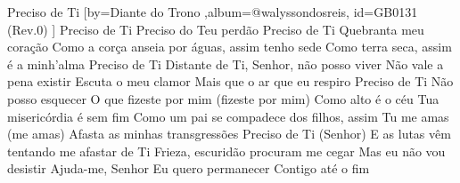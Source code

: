 \beginsong
{Preciso de Ti %
}[by={Diante do Trono %
},album={@walyssondosreis},
id={GB0131 %
(Rev.0) %
}]
\beginverse*
Preciso de Ti
Preciso do Teu perdão
Preciso de Ti
Quebranta meu coração
Como a corça anseia por águas, assim tenho sede
Como terra seca, assim é a minh'alma
Preciso de Ti
\endverse
\beginchorus
Distante de Ti, Senhor, não posso viver
Não vale a pena existir
Escuta o meu clamor
Mais que o ar que eu respiro
Preciso de Ti
\endchorus
\beginverse*
Não posso esquecer
O que fizeste por mim (fizeste por mim)
Como alto é o céu
Tua misericórdia é sem fim
Como um pai se compadece dos filhos, assim Tu me amas (me amas)
Afasta as minhas transgressões
Preciso de Ti (Senhor)
\endverse
\beginverse*
E as lutas vêm tentando me afastar de Ti
Frieza, escuridão procuram me cegar
Mas eu não vou desistir
Ajuda-me, Senhor
Eu quero permanecer Contigo até o fim
\endverse


